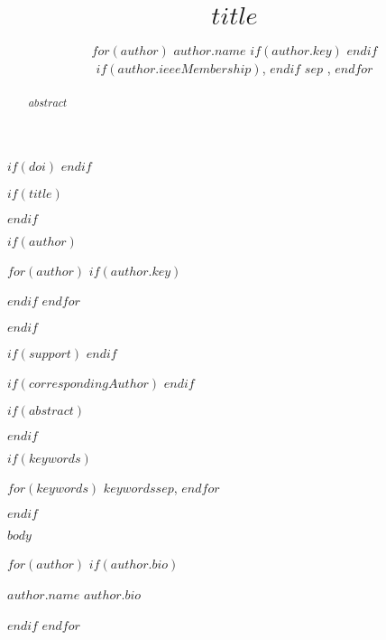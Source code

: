 \documentclass{ieeeaccess}
\begin{document}
$if(doi)$
$endif$

$if(title)$
\title{$title$}
$endif$

$if(author)$

\author{
$for(author)$
\uppercase{$author.name$} $if(author.key)$  $endif$ $if(author.ieeeMembership)$,  $endif$ $sep$ ,
$endfor$
}

$for(author)$
$if(author.key)$
\address[$author.key$]{
	$if(author.institution)$ $author.institution$ $endif$,
	$if(author.city)$ $author.city$ $endif$,
	$if(author.address)$ $author.address$ $endif$
	$if(author.email)$ (email: $author.email$) $endif$
}
$endif$
$endfor$

$endif$

$if(support)$  $endif$


$if(correspondingAuthor)$  $endif$

$if(abstract)$
\begin{abstract}
$abstract$
\end{abstract}
$endif$

$if(keywords)$
\begin{keywords}
$for(keywords)$
	$keywords$$sep$,
$endfor$
\end{keywords}
$endif$

\titlepgskip=-15pt
\maketitle

$body$

 



$for(author)$
$if(author.bio)$
\begin{IEEEbiography} 
	{$author.name$} $author.bio$
\end{IEEEbiography}
$endif$
$endfor$

\EOD
\end{document}
